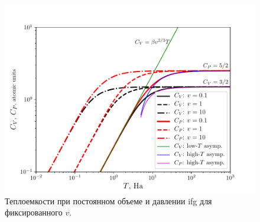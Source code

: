 \begin{figure}[!h]
    \hspace{-2cm}
  \includegraphics[width=1.2\columnwidth]{img/cv_cp}
  \caption{Теплоемкости при постоянном объеме и давлении \acrshort{ifg} для фиксированного $v$.}
  \label{fig:heat_capacity}
\end{figure}
